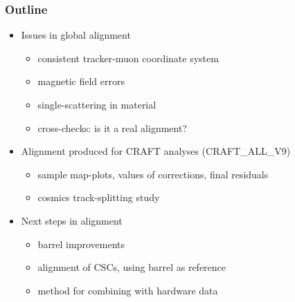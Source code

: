 \documentclass[compress]{beamer}
\begin{document}
\begin{frame}
\frametitle{Outline}
\begin{itemize}\setlength{\itemsep}{0.75 cm}
\item Issues in global alignment
\begin{itemize}
\item consistent tracker-muon coordinate system
\item magnetic field errors
\item single-scattering in material
\item cross-checks: is it a real alignment?
\end{itemize}

\item Alignment produced for CRAFT analyses (CRAFT\_ALL\_V9)
\begin{itemize}
\item sample map-plots, values of corrections, final residuals
\item cosmics track-splitting study
\end{itemize}

\item Next steps in alignment
\begin{itemize}
\item barrel improvements
\item alignment of CSCs, using barrel as reference
\item method for combining with hardware data
\end{itemize}
\end{itemize}
\end{frame}
\end{document}
